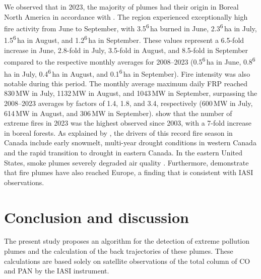 \documentclass[acp, manuscript]{copernicus}
\begin{document}
We observed that in 2023, the majority of plumes had their origin in Boreal North America in accordance with \citet{jonesStateWildfires202320242024}. The region experienced exceptionally high fire activity from June to September, with 3.5\textsuperscript{6}\,ha burned in June, 2.3\textsuperscript{6}\,ha in July, 1.5\textsuperscript{6}\,ha in August, and 1.2\textsuperscript{6}\,ha in September. These values represent a 6.5-fold increase in June, 2.8-fold in July, 3.5-fold in August, and 8.5-fold in September compared to the respective monthly averages for 2008--2023 (0.5\textsuperscript{6}\,ha in June, 0.8\textsuperscript{6}\,ha in July, 0.4\textsuperscript{6}\,ha in August, and 0.1\textsuperscript{6}\,ha in September).
Fire intensity was also notable during this period. The monthly average maximum daily FRP reached 830\,MW in July, 1132\,MW in August, and 1043\,MW in September, surpassing the 2008--2023 averages by factors of 1.4, 1.8, and 3.4, respectively (600\,MW in July, 614\,MW in August, and 306\,MW in September). \citet {cunninghamIncreasingFrequencyIntensity2024} show that the number of extreme fires in 2023 was the highest observed since 2003, with a 7-fold increase in boreal forests.
As explained by \citet{jainDriversImpactsRecordBreaking2024}, the drivers of this record fire season in Canada include early snowmelt, multi-year drought conditions in western Canada and the rapid transition to drought in eastern Canada.
In the eastern United States, smoke plumes severely degraded air quality \citep{koldenWildfires20232024,chenCanadianRecordbreakingWildfires2025}. Furthermore, \citet{wangSevereGlobalEnvironmental2024} demonstrate that fire plumes have also reached Europe, a finding that is consistent with IASI observations. 



\section{Conclusion and discussion}\label{sect:conclu_chap4}

The present study proposes an algorithm for the detection of extreme pollution plumes and the calculation of the back trajectories of these plumes. These calculations are based solely on satellite observations of the total column of CO and PAN by the IASI instrument. 
\end{document}
